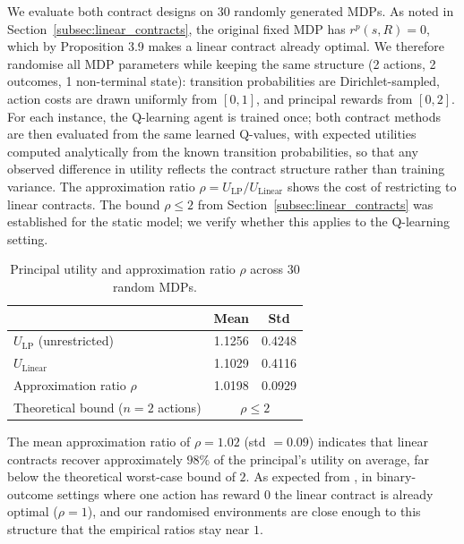 \documentclass{article}
\theoremstyle{plain}
\theoremstyle{definition}
\theoremstyle{remark}
\begin{document}
We evaluate both contract designs on 30 randomly generated MDPs. As noted in Section~\ref{subsec:linear_contracts}, the original fixed MDP has $r^p(s,R) = 0$, which by Proposition 3.9 \citep{dutting2024survey} makes a linear contract already optimal. We therefore randomise all MDP parameters while keeping the same structure (2 actions, 2 outcomes, 1 non-terminal state): transition probabilities are Dirichlet-sampled, action costs are drawn uniformly from $[0,1]$, and principal rewards from $[0,2]$. For each instance, the Q-learning agent is trained once; both contract methods are then evaluated from the same learned Q-values, with expected utilities computed analytically from the known transition probabilities, so that any observed difference in utility reflects the contract structure rather than training variance. The approximation ratio $\rho = U_{\mathrm{LP}} / U_{\mathrm{Linear}}$ shows the cost of restricting to linear contracts. The bound $\rho \leq 2$ from Section~\ref{subsec:linear_contracts} was established for the static model; we verify whether this applies to the Q-learning setting.

\begin{table}[ht]
  \caption{Principal utility and approximation ratio $\rho$ across 30 random MDPs.}
  \label{tab:linear_results}
  \begin{center}
    \begin{small}
      \begin{sc}
        \begin{tabular}{lcc}
          \toprule
           & Mean & Std \\
          \midrule
          $U_{\mathrm{LP}}$ (unrestricted) & 1.1256 & 0.4248 \\
          $U_{\mathrm{Linear}}$             & 1.1029 & 0.4116 \\
          Approximation ratio $\rho$        & 1.0198 & 0.0929 \\
          \midrule
          Theoretical bound ($n=2$ actions) & \multicolumn{2}{c}{$\rho \leq 2$} \\
          \bottomrule
        \end{tabular}
      \end{sc}
    \end{small}
  \end{center}
  \vskip -0.1in
\end{table}

The mean approximation ratio of $\rho = 1.02$ (std $= 0.09$) indicates that linear contracts recover approximately $98\%$ of the principal’s utility on average, far below the theoretical worst-case bound of $2$. As expected from \citet{dutting2024survey}, in binary-outcome settings where one action has reward 0 the linear contract is already optimal ($\rho = 1$), and our randomised environments are close enough to this structure that the empirical ratios stay near $1$.
\end{document}
